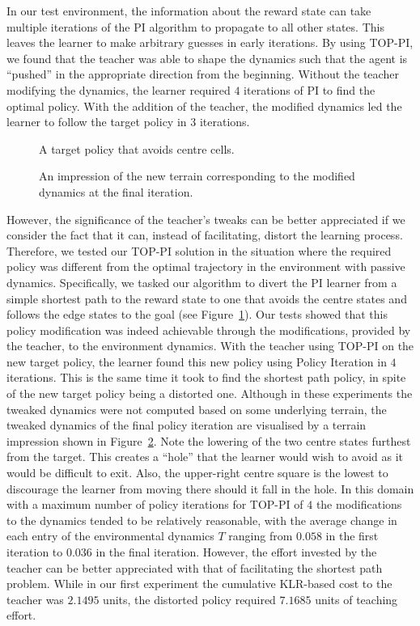 In our test environment, the information about the reward state can
take multiple iterations of the PI algorithm to propagate to all other
states.  This leaves the learner to make arbitrary guesses in early
iterations.  By using TOP-PI, we found that the teacher was able to
shape the dynamics such that the agent is ``pushed'' in the
appropriate direction from the beginning.  Without the teacher
modifying the dynamics, the learner required $4$ iterations of PI to
find the optimal policy.  With the addition of the teacher, the
modified dynamics led the learner to follow the target policy in $3$
iterations.

\begin{figure}[ht]
\centerline{}
\caption{\label{newopt}A target policy that avoids centre cells.}
\end{figure}

\begin{figure}[ht]
\centerline{}
\caption{\label{newalt}An impression of the new terrain corresponding to the modified dynamics at the final iteration.}
\end{figure}

However, the significance of the teacher's tweaks can be better
appreciated if we consider the fact that it can, instead of
facilitating, distort the learning process. Therefore, we tested our
TOP-PI solution in the situation where the required policy was
different from the optimal trajectory in the environment with passive
dynamics. Specifically, we tasked our algorithm to divert the PI
learner from a simple shortest path to the reward state to one that
avoids the centre states and follows the edge states to the goal (see
Figure~\ref{newopt}).  Our tests showed that this policy modification
was indeed achievable through the modifications, provided by the
teacher, to the environment dynamics.  With the teacher using TOP-PI
on the new target policy, the learner found this new policy using
Policy Iteration in $4$ iterations. This is the same time it took to
find the shortest path policy, in spite of the new target policy being
a distorted one.  Although in these experiments the tweaked dynamics
were not computed based on some underlying terrain, the tweaked
dynamics of the final policy iteration are visualised by a terrain
impression shown in Figure~\ref{newalt}.  Note the lowering of the two
centre states furthest from the target.  This creates a ``hole'' that
the learner would wish to avoid as it would be difficult to exit.
Also, the upper-right centre square is the lowest to discourage the
learner from moving there should it fall in the hole. In this domain
with a maximum number of policy iterations for TOP-PI of $4$ the
modifications to the dynamics tended to be relatively reasonable, with
the average change in each entry of the environmental dynamics $T$
ranging from $0.058$ in the first iteration to $0.036$ in the final
iteration. However, the effort invested by the teacher can be better
appreciated with that of facilitating the shortest path
problem. While in our first experiment the cumulative KLR-based cost
to the teacher was $2.1495$ units, the distorted policy required
$7.1685$ units of teaching effort.

